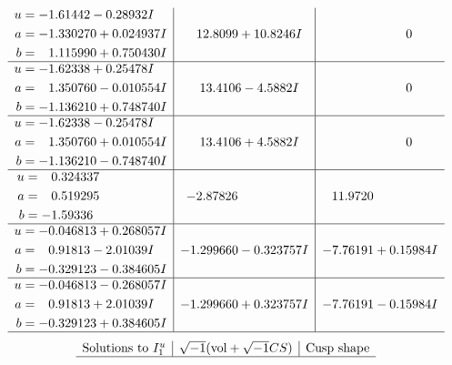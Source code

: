 \documentclass[1p]{elsarticle_modified}
\theoremstyle{definition}
\newcommand{\I}{\sqrt{-1}}
\begin{document}
$$\begin{array}{c|c|c}
\begin{aligned}
u &= -1.61442 - 0.28932 I \\
a &= -1.330270 + 0.024937 I \\
b &= \phantom{-}1.115990 + 0.750430 I\end{aligned}
 & \phantom{-}12.8099 + 10.8246 I & \phantom{-0.000000 } 0 \\ \hline\begin{aligned}
u &= -1.62338 + 0.25478 I \\
a &= \phantom{-}1.350760 - 0.010554 I \\
b &= -1.136210 + 0.748740 I\end{aligned}
 & \phantom{-}13.4106 - 4.5882 I & \phantom{-0.000000 } 0 \\ \hline\begin{aligned}
u &= -1.62338 - 0.25478 I \\
a &= \phantom{-}1.350760 + 0.010554 I \\
b &= -1.136210 - 0.748740 I\end{aligned}
 & \phantom{-}13.4106 + 4.5882 I & \phantom{-0.000000 } 0 \\ \hline\begin{aligned}
u &= \phantom{-}0.324337\phantom{ +0.000000I} \\
a &= \phantom{-}0.519295\phantom{ +0.000000I} \\
b &= -1.59336\phantom{ +0.000000I}\end{aligned}
 & -2.87826\phantom{ +0.000000I} & \phantom{-}11.9720\phantom{ +0.000000I} \\ \hline\begin{aligned}
u &= -0.046813 + 0.268057 I \\
a &= \phantom{-}0.91813 - 2.01039 I \\
b &= -0.329123 - 0.384605 I\end{aligned}
 & -1.299660 - 0.323757 I & -7.76191 + 0.15984 I \\ \hline\begin{aligned}
u &= -0.046813 - 0.268057 I \\
a &= \phantom{-}0.91813 + 2.01039 I \\
b &= -0.329123 + 0.384605 I\end{aligned}
 & -1.299660 + 0.323757 I & -7.76191 - 0.15984 I\\
 \hline 
 \end{array}$$\newpage$$\begin{array}{c|c|c}  
\text{Solutions to }I^u_{1}& \I (\text{vol} + \sqrt{-1}CS) & \text{Cusp shape}\\
 \hline 

\end{array}$$
\end{document}
